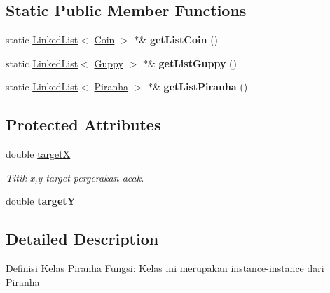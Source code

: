 \subsection*{Static Public Member Functions}
\begin{DoxyCompactItemize}
\item 
\mbox{\label{class_piranha_a35f8c551baa7651a1642147bccaa159c}} 
static \mbox{\hyperlink{class_linked_list}{Linked\+List}}$<$ \mbox{\hyperlink{class_coin}{Coin}} $>$ $\ast$\& {\bfseries get\+List\+Coin} ()
\item 
\mbox{\label{class_piranha_aeda32d595a92525c180893422bb8be46}} 
static \mbox{\hyperlink{class_linked_list}{Linked\+List}}$<$ \mbox{\hyperlink{class_guppy}{Guppy}} $>$ $\ast$\& {\bfseries get\+List\+Guppy} ()
\item 
\mbox{\label{class_piranha_a143062bcf6dca8654b800cf3032671b6}} 
static \mbox{\hyperlink{class_linked_list}{Linked\+List}}$<$ \mbox{\hyperlink{class_piranha}{Piranha}} $>$ $\ast$\& {\bfseries get\+List\+Piranha} ()
\end{DoxyCompactItemize}
\subsection*{Protected Attributes}
\begin{DoxyCompactItemize}
\item 
\mbox{\label{class_piranha_a9e1da2df00f9384e053a75cd57dacb28}} 
double \mbox{\hyperlink{class_piranha_a9e1da2df00f9384e053a75cd57dacb28}{targetX}}
\begin{DoxyCompactList}\small\item\em Titik x,y target pergerakan acak. \end{DoxyCompactList}\item 
\mbox{\label{class_piranha_a3b3ffe7297e6e4a9b9baecb502c1ed7e}} 
double {\bfseries targetY}
\end{DoxyCompactItemize}


\subsection{Detailed Description}
Definisi Kelas \mbox{\hyperlink{class_piranha}{Piranha}} Fungsi\+: Kelas ini merupakan instance-\/instance dari \mbox{\hyperlink{class_piranha}{Piranha}} 

